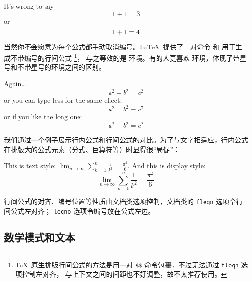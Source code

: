 \begin{example}
It's wrong to say
\begin{equation}
1 + 1 = 3 \tag{dumb}
\end{equation}
or
\begin{equation}
1 + 1 = 4 \notag
\end{equation}
\end{example}

当然你不会愿意为每个公式都手动取消编号。\LaTeX\ 提供了一对命令 \cmd{[} 和 \cmd{]} 用于生成不带编号的行间公式%
\footnote{\TeX\ 原生排版行间公式的方法是用一对 \texttt{\$\$} 命令包裹，不过无法通过 \texttt{fleqn} 选项控制左对齐，
与上下文之间的间距也不好调整，故不太推荐使用。}，
与之等效的是  环境。有的人更喜欢  环境，体现了带星号和不带星号的环境之间的区别。

\begin{example}
Again\ldots
\begin{equation*}
a^2 + b^2 = c^2
\end{equation*}
or you can type less for the
same effect:
\[ a^2 + b^2 = c^2 \]
or if you like the long one:
\begin{displaymath}
a^2 + b^2 = c^2
\end{displaymath}
\end{example}

我们通过一个例子展示行内公式和行间公式的对比。为了与文字相适应，行内公式在排版大的公式元素（分式、巨算符等）时显得很“局促”：

\begin{example}
This is text style:
$\lim_{n \to \infty}
\sum_{k=1}^n \frac{1}{k^2}
= \frac{\pi^2}{6}$.
And this is display style:
\[
\lim_{n \to \infty}
\sum_{k=1}^n \frac{1}{k^2}
= \frac{\pi^2}{6}
\]
\end{example}

行间公式的对齐、编号位置等性质由文档类选项控制，文档类的 \texttt{fleqn} 选项令行间公式左对齐；
\texttt{leqno} 选项令编号放在公式左边。

\subsection{数学模式和文本}\label{subsec:math-mode}

